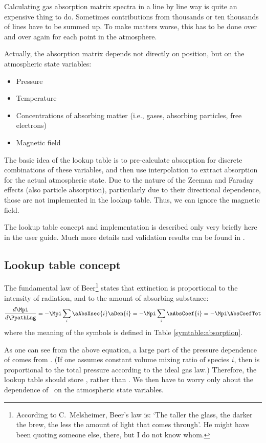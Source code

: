 Calculating gas absorption matrix spectra in a line by line way
is quite an expensive thing to do. Sometimes contributions from
thousands or ten thousands of lines have to be summed up. To make
matters worse, this has to be done over and over again for each point
in the atmosphere.

Actually, the absorption matrix depends not directly on position,
but on the atmospheric state variables:
\begin{itemize}
\item Pressure
\item Temperature
\item Concentrations of absorbing matter (i.e., gases, absorbing particles, free
electrons)
\item Magnetic field
\end{itemize}

The basic idea of the lookup table is to pre-calculate absorption for
discrete combinations of these variables, and then use interpolation
to extract absorption for the actual atmospheric state. Due to the nature of
the Zeeman and Faraday effects (also particle absorption), particularly due to
their directional dependence, those are not implemented in the lookup table.
Thus, we can ignore the magnetic field.

The lookup table concept and implementation is described only very
briefly here in the user guide. Much more details and validation
results can be found in \citet{buehler:absor:11}.

\subsection{Lookup table concept}

The fundamental law of Beer\footnote{According to C.\ Melsheimer,
  Beer's law is: `The taller the glass, the darker the brew, the less
  the amount of light that comes through'. He might have been quoting
  someone else, there, but I do not know whom.} states that extinction
is proportional to the intensity of radiation, and to the amount of
absorbing substance:
\begin{equation}
  \label{eq:lookup:beer}
  \frac{d \Mpi}{d \PpathLng}
  =
  - \Mpi \sum_i \aAbsXsec{i} \aDen{i}
  =
  - \Mpi \sum_i \aAbsCoef{i}
  =
  - \Mpi \AbsCoefTot
\end{equation}
where the meaning of the symbols is defined in Table
\ref{symtable:absorption}. 

As one can see from the above equation, a large part of the pressure
dependence of  comes from . (If one assumes
constant volume mixing ratio of species $i$, then  is
proportional to the total pressure according to the ideal gas law.) 
Therefore, the lookup table should store \AbsXsec, rather than
\AbsCoef. We then have to worry only about the dependence of \AbsXsec\
on the atmospheric state variables.

